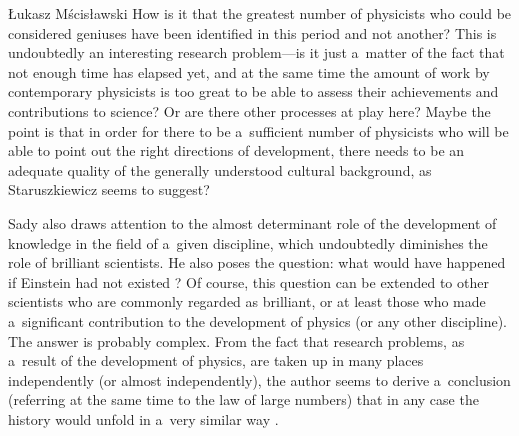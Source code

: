 \begin{newrevengenv}{Łukasz Mścisławski}
How is it that the greatest number of physicists who could be considered geniuses have been identified in this period and not another? This is undoubtedly an interesting research problem---is it just a~matter of the fact that not enough time has elapsed yet, and at the same time the amount of work by contemporary physicists is too great to be able to assess their achievements and contributions to science? Or are there other processes at play here? Maybe the point is that in order for there to be a~sufficient number of physicists who will be able to point out the right directions of development, there needs to be an adequate quality of the generally understood cultural background, as Staruszkiewicz
\parencite*[][]{staruszkiewicz_wspolczesny_2001} %
seems to suggest?


Sady also draws attention to the almost determinant role of the development of knowledge in the field of a~given discipline, which undoubtedly diminishes the role of brilliant scientists. He also poses the question: what would have happened if Einstein had not existed
\parencite[][pp.120--121]{sady_struktura_2020}? %
 Of course, this question can be extended to other scientists who are commonly regarded as brilliant, or at least those who made a~significant contribution to the development of physics (or any other discipline). The answer is probably complex. From the fact that research problems, as a~result of the development of physics, are taken up in many places independently (or almost independently), the author seems to derive a~conclusion (referring at the same time to the law of large numbers) that in any case the history would unfold in a~very similar way 
\parencite[cf.][pp.120--121, 213]{sady_struktura_2020}.%



\end{newrevengenv}
